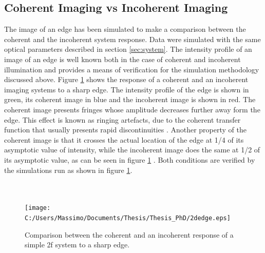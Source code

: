\subsection{Coherent Imaging vs Incoherent Imaging}
The image of an edge has been simulated to make a comparison between the coherent and the incoherent system response. Data were simulated with the same optical parameters described in section \ref{sec:system}. The intensity profile of an image of an edge is well known both in the case of coherent and incoherent illumination and provides a means of verification for the simulation methodology discussed above. Figure \ref{fig:coherenceprofile} shows the response of a coherent and an incoherent imaging systems to a sharp edge. The intensity profile of the edge is shown in green, its coherent image in blue and the incoherent image is shown in red. The coherent image presents fringes whose amplitude decreases further away form the edge. This effect is known as ringing artefacts, due to the coherent transfer function that usually presents rapid discontinuities \cite{goodman2005introduction}. Another property of the coherent image is that it crosses the actual location of the edge at 1/4 of its asymptotic value of intensity, while the incoherent image does the same at 1/2 of its asymptotic value, as can be seen in figure \ref{fig:coherenceprofile} \cite{goodman2005introduction}. Both conditions are verified by the simulations run as shown in figure \ref{fig:coherenceprofile}. \\
\\
\\
\begin{figure}[H]
	\centering
	\texttt{[image: C:/Users/Massimo/Documents/Thesis/Thesis\_PhD/2dedge.eps]}
	\caption{\label{fig:coherenceprofile}Comparison between the coherent and an incoherent response of a simple 2f system to a sharp edge.}
\end{figure}
